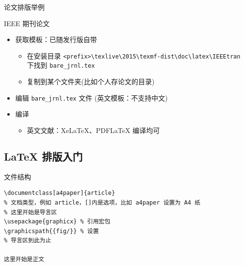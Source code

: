 \begin{frame}[fragile]{论文排版举例}
  \begin{exampleblock}{IEEE 期刊论文}
    \begin{itemize}
      \item 获取模板：已随发行版自带
        \begin{itemize}
          \item 在安装目录 \verb|<prefix>\texlive\2015\texmf-dist\doc\latex\IEEEtran|
            下找到 \verb|bare_jrnl.tex|
          \item 复制到某个文件夹(比如个人存论文的目录)
        \end{itemize}
      \item 编辑 \verb|bare_jrnl.tex| 文件 (英文模板：不支持中文)
      \item 编译
        \begin{itemize}
          \item 英文文献：XeLaTeX、PDFLaTeX 编译均可
        \end{itemize}
    \end{itemize}
  \end{exampleblock}
\end{frame}

\subsection{\LaTeX{} 排版入门}

\begin{frame}[fragile]{文件结构}
\begin{verbatim}
\documentclass[a4paper]{article}
% 文档类型，例如 article，[]内是选项，比如 a4paper 设置为 A4 纸
% 这里开始是导言区
\usepackage{graphicx} % 引用宏包
\graphicspath{{fig/}} % 设置
% 导言区到此为止

这里开始是正文

\end{verbatim}
\end{frame}

